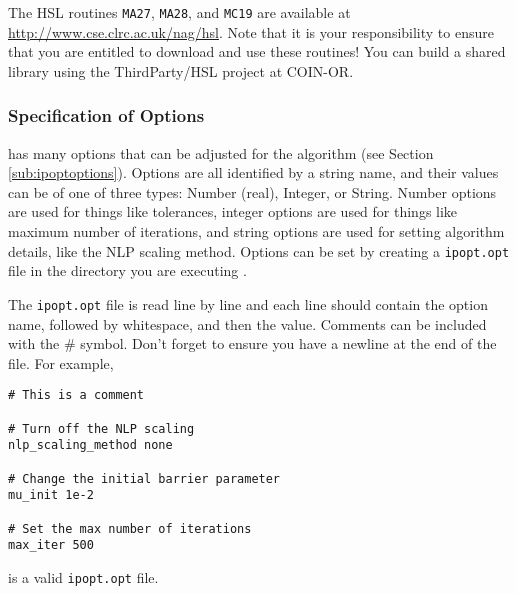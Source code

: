 The HSL routines \texttt{MA27}, \texttt{MA28}, and \texttt{MC19} are available at \url{http://www.cse.clrc.ac.uk/nag/hsl}.
Note that it is your responsibility to ensure that you are entitled to download and use these routines!
You can build a shared library using the ThirdParty/HSL project at COIN-OR.

% 


\subsubsection{Specification of Options}
\label{sub:ipoptoptionspec}

\IPOPT has many options that can be adjusted for the algorithm (see Section \ref{sub:ipoptoptions}).
Options are all identified by a string name, and their values can be of one of three types: Number (real), Integer, or String.
Number options are used for things like tolerances, integer options are used for things like maximum number of iterations, and string options are used for setting algorithm details, like the NLP scaling method.
Options can be set by creating a \texttt{ipopt.opt} file in the directory you are executing \IPOPT.

The \texttt{ipopt.opt} file is read line by line and each line should contain the option name, followed by whitespace, and then the value.
Comments can be included with the \# symbol. Don't forget to ensure you have a newline at the end of the file. For example,
\begin{verbatim}
# This is a comment

# Turn off the NLP scaling
nlp_scaling_method none

# Change the initial barrier parameter
mu_init 1e-2

# Set the max number of iterations
max_iter 500
\end{verbatim}
is a valid \texttt{ipopt.opt} file.

